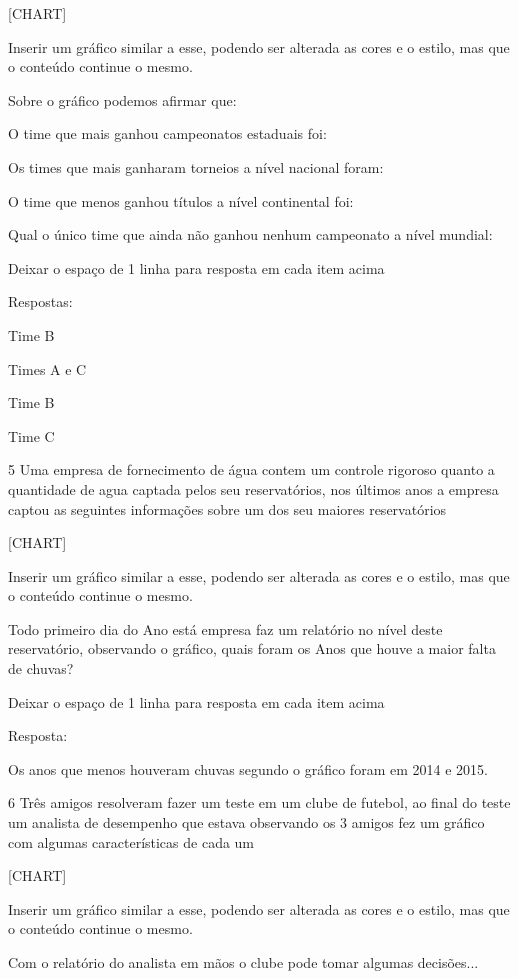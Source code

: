 {{[}CHART{]}}

Inserir um gráfico similar a esse, podendo ser alterada as cores e o
estilo, mas que o conteúdo continue o mesmo.

Sobre o gráfico podemos afirmar que:

\item O time que mais ganhou campeonatos estaduais foi:
\item Os times que mais ganharam torneios a nível nacional foram:
\item O time que menos ganhou títulos a nível continental foi:
\item Qual o único time que ainda não ganhou nenhum campeonato a nível
mundial:

Deixar o espaço de 1 linha para resposta em cada item acima

Respostas:

\item Time B
\item Times A e C
\item Time B
\item Time C

\num{5} Uma empresa de fornecimento de água contem um controle rigoroso
quanto a quantidade de agua captada pelos seu reservatórios, nos últimos
anos a empresa captou as seguintes informações sobre um dos seu maiores
reservatórios

{{[}CHART{]}}

Inserir um gráfico similar a esse, podendo ser alterada as cores e o
estilo, mas que o conteúdo continue o mesmo.

Todo primeiro dia do Ano está empresa faz um relatório no nível deste
reservatório, observando o gráfico, quais foram os Anos que houve a
maior falta de chuvas?

Deixar o espaço de 1 linha para resposta em cada item acima

Resposta:

Os anos que menos houveram chuvas segundo o gráfico foram em 2014 e
2015.

\num{6} Três amigos resolveram fazer um teste em um clube de futebol, ao
final do teste um analista de desempenho que estava observando os 3
amigos fez um gráfico com algumas características de cada um

{{[}CHART{]}}

Inserir um gráfico similar a esse, podendo ser alterada as cores e o
estilo, mas que o conteúdo continue o mesmo.

Com o relatório do analista em mãos o clube pode tomar algumas
decisões...

